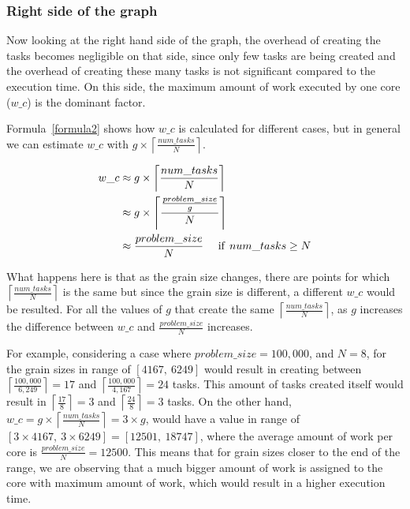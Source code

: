 \subsubsection{Right side of the graph}
Now looking at the right hand side of the graph, the overhead of creating the tasks becomes negligible on that side, since only few tasks are being created and the overhead of creating these many tasks is not significant compared to the execution time. On this side, the maximum amount of work executed by one core ($w\_c$) is the dominant factor.

Formula~\ref{formula2} shows how $w\_c$ is calculated for different cases, but in general we can estimate $w\_c$ with $g\times\left \lceil{\frac{num\_{tasks}}{N}}\right \rceil$. 

\begin{equation}\label{formula6}
\begin{aligned}
w\_c&\approx{g\times\left \lceil{\frac{num\_{tasks}}{N}}\right \rceil}\\
&\approx{g\times\left \lceil{\frac{\frac{problem\_{size}}{g}}{N}}\right \rceil}\\
&\approx{\frac{problem\_{size}}{N}} \:\:\text{\:\:\:\:if\:\:} num\_{tasks}\geq{N}
\end{aligned}
\end{equation}

What happens here is that as the grain size changes, there are points for which $\left \lceil{\frac{num\_{tasks}}{N}}\right \rceil$ is the same but since the grain size is different, a different $w\_c$ would be resulted. 
For all the values of $g$ that create the same $\left \lceil{\frac{num\_{tasks}}{N}}\right \rceil$, as $g$ increases the difference between $w\_c$ and $\frac{problem\_{size}}{N}$ increases. 

For example, considering a case where $problem\_{size}=100,000$, and $N=8$, for the grain sizes in range of $[4167,\:6249]$ would result in creating between $\left \lceil{\frac{100,000}{6,249}}\right \rceil=17$ and  $\left \lceil{\frac{100,000}{4,167}}\right \rceil=24$ tasks. This amount of tasks created itself would result in $\left \lceil{\frac{17}{8}}\right \rceil=3$ and  $\left \lceil{\frac{24}{8}}\right \rceil=3$ tasks.
On the other hand, $w\_c=g\times{\left \lceil{\frac{num\_{tasks}}{N}}\right \rceil}=3\times{g}$, would have a value in range of $[3\times4167,\:3\times6249]=[12501,\: 18747]$, where the average amount of work per core is $\frac{problem\_{size}}{N}=12500$. This means that for grain sizes closer to the end of the range, we are observing that a much bigger amount of work is assigned to the core with maximum amount of work, which would result in a higher execution time. 


